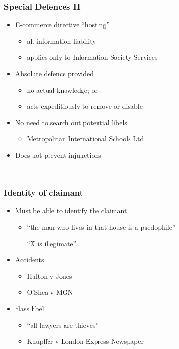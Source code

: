 \documentclass[ignorenonframetext,]{beamer}
\begin{document}
\begin{frame}
\frametitle{Special Defences II}

\begin{itemize}
\item  E-commerce directive ``hosting''

  \begin{itemize}
  \item    all information liability
  \item    applies only to Information Society Services
  \end{itemize}
\item  Absolute defence provided

  \begin{itemize}
  \item    no actual knowledge; or
  \item    acts expeditiously to remove or disable
  \end{itemize}
\item  {No need to search out potential libels}

  \begin{itemize}
  \item    {Metropolitan International Schools Ltd}
  \end{itemize}
\item  Does not prevent injunctions
\end{itemize}

~


\end{frame}

\begin{frame}
\frametitle{Identity of claimant}

\begin{itemize}
\item  Must be able to identify the claimant

  \begin{itemize}
  \item    ``the man who lives in that house is a paedophile''

    ``X is illegimate''
  \end{itemize}
\item  Accidents

  \begin{itemize}
  \item    Hulton v Jones 
  \item    O'Shea v MGN
  \end{itemize}
\item  class libel 

  \begin{itemize}
  \item    ``all lawyers are thieves''
  \item    Knupffer v London Express Newspaper
  \end{itemize}
\end{itemize}

~


\end{frame}
\end{document}

